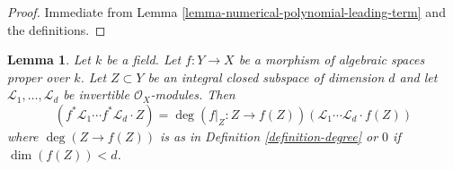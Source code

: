 \documentclass{stacks-project}
\theoremstyle{plain}
\newtheorem{lemma}[subsection]{Lemma}
\theoremstyle{definition}
\theoremstyle{remark}
\numberwithin{equation}{subsection}
\begin{document}
\begin{proof}
Immediate from Lemma \ref{lemma-numerical-polynomial-leading-term}
and the definitions.
\end{proof}

\begin{lemma}
\label{lemma-intersection-number-and-pullback}
Let $k$ be a field. Let $f : Y \to X$ be a morphism of
algebraic spaces proper over $k$.
Let $Z \subset Y$ be an integral closed subspace of dimension $d$ and let
$\mathcal{L}_1, \ldots, \mathcal{L}_d$ be invertible $\mathcal{O}_X$-modules.
Then
$$
(f^*\mathcal{L}_1 \cdots f^*\mathcal{L}_d \cdot Z) =
\deg(f|_Z : Z \to f(Z)) (\mathcal{L}_1 \cdots \mathcal{L}_d \cdot f(Z))
$$
where $\deg(Z \to f(Z))$ is as in Definition \ref{definition-degree}
or $0$ if $\dim(f(Z)) < d$.
\end{lemma}
\end{document}
